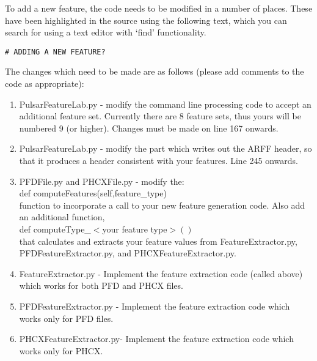 \documentclass[twoside,a4paper]{refart}
\begin{document}
To add a new feature, the code needs to be modified in a number of places. These have been highlighted in the source using the following text, which you can search for using a text editor with `find' functionality.
\begin{lstlisting}
# ADDING A NEW FEATURE?
\end{lstlisting}
The changes which need to be made are as follows (please add comments to the code as appropriate):
\begin{enumerate}
\item PulsarFeatureLab.py - modify the command line processing code to accept an additional feature set. Currently there are 8 feature sets, thus yours will be numbered 9 (or higher). Changes must be made on line 167 onwards.
\item PulsarFeatureLab.py - modify the part which writes out the ARFF header, so that it produces a header consistent with your features. Line 245 onwards.
\item PFDFile.py and PHCXFile.py - modify the:\\\indent \hspace{2em}def computeFeatures(self,feature\_type)\\function to incorporate a call to your new feature generation code. Also add an additional function,\\\indent \hspace{2em} def computeType\_$<$your feature type$>()$\\ that calculates and extracts your feature values from FeatureExtractor.py, PFDFeatureExtractor.py, and PHCXFeatureExtractor.py.
\item FeatureExtractor.py - Implement the feature extraction code (called above) which works for both PFD and PHCX files.
\item PFDFeatureExtractor.py - Implement the feature extraction code which works only for PFD files.
\item PHCXFeatureExtractor.py- Implement the feature extraction code which works only for PHCX.
\end{enumerate}
\newpage



\printindex
\end{document}
